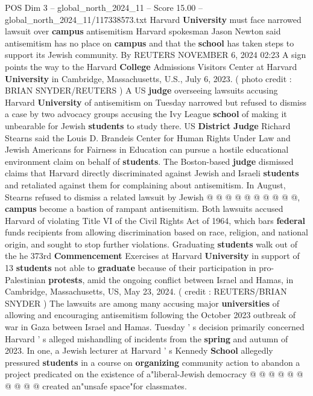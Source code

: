 \begin{textsample}{POS Dim 3 – global\_north\_2024\_11 – Score 15.00 – global\_north\_2024\_11/117338573.txt}  \label{ex:f3_pos_172}
Harvard \textbf{University} must face narrowed lawsuit over \textbf{campus} antisemitism Harvard spokesman Jason Newton said antisemitism has no place on \textbf{campus} and that the \textbf{school} has taken steps to support its Jewish community.
By REUTERS NOVEMBER 6, 2024 02:23 A sign points the way to the Harvard \textbf{College} Admissions Visitors Center at Harvard \textbf{University} in Cambridge, Massachusetts, U.S., July 6, 2023. ( photo credit : BRIAN SNYDER/REUTERS ) A US \textbf{judge} overseeing lawsuits accusing Harvard \textbf{University} of antisemitism on Tuesday narrowed but refused to dismiss a case by two advocacy groups accusing the Ivy League \textbf{school} of making it unbearable for Jewish \textbf{students} to study there.
US \textbf{District} \textbf{Judge} Richard Stearns said the Louis D.
Brandeis Center for Human Rights Under Law and Jewish Americans for Fairness in Education can pursue a hostile educational environment claim on behalf of \textbf{students}.
The Boston-based \textbf{judge} dismissed claims that Harvard directly discriminated against Jewish and Israeli \textbf{students} and retaliated against them for complaining about antisemitism.
In August, Stearns refused to dismiss a related lawsuit by Jewish @ @ @ @ @ @ @ @ @ @, \textbf{campus} become a bastion of rampant antisemitism.
Both lawsuits accused Harvard of violating Title VI of the Civil Rights Act of 1964, which bars \textbf{federal} funds recipients from allowing discrimination based on race, religion, and national origin, and sought to stop further violations.
Graduating \textbf{students} walk out of the he 373rd \textbf{Commencement} Exercises at Harvard \textbf{University} in support of 13 \textbf{students} not able to \textbf{graduate} because of their participation in pro-Palestinian \textbf{protests}, amid the ongoing conflict between Israel and Hamas, in Cambridge, Massachusetts, US, May 23, 2024. ( credit : REUTERS/BRIAN SNYDER ) The lawsuits are among many accusing major \textbf{universities} of allowing and encouraging antisemitism following the October 2023 outbreak of war in Gaza between Israel and Hamas.
Tuesday ' s decision primarily concerned Harvard ' s alleged mishandling of incidents from the \textbf{spring} and autumn of 2023.
In one, a Jewish lecturer at Harvard ' s Kennedy \textbf{School} allegedly pressured \textbf{students} in a course on \textbf{organizing} community action to abandon a project predicated on the existence of a"liberal-Jewish democracy @ @ @ @ @ @ @ @ @ @ created an"unsafe space"for classmates.

\end{textsample}
